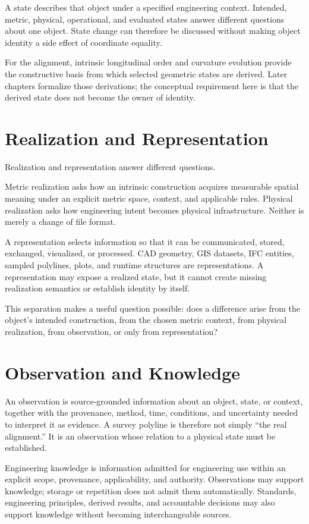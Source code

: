 A state describes that object under a specified engineering context. Intended,
metric, physical, operational, and evaluated states answer different questions
about one object. State change can therefore be discussed without making object
identity a side effect of coordinate equality.

For the alignment, intrinsic longitudinal order and curvature evolution provide
the constructive basis from which selected geometric states are derived. Later
chapters formalize those derivations; the conceptual requirement here is that
the derived state does not become the owner of identity.

\section{Realization and Representation}

Realization and representation answer different questions.

Metric realization asks how an intrinsic construction acquires measurable
spatial meaning under an explicit metric space, context, and applicable rules.
Physical realization asks how engineering intent becomes physical
infrastructure. Neither is merely a change of file format.

A representation selects information so that it can be communicated, stored,
exchanged, visualized, or processed. CAD geometry, GIS datasets, IFC entities,
sampled polylines, plots, and runtime structures are representations. A
representation may expose a realized state, but it cannot create missing
realization semantics or establish identity by itself.

This separation makes a useful question possible: does a difference arise from
the object's intended construction, from the chosen metric context, from
physical realization, from observation, or only from representation?

\section{Observation and Knowledge}

An observation is source-grounded information about an object, state, or
context, together with the provenance, method, time, conditions, and uncertainty
needed to interpret it as evidence. A survey polyline is therefore not simply
``the real alignment.'' It is an observation whose relation to a physical state
must be established.

Engineering knowledge is information admitted for engineering use within an
explicit scope, provenance, applicability, and authority. Observations may
support knowledge; storage or repetition does not admit them automatically.
Standards, engineering principles, derived results, and accountable decisions
may also support knowledge without becoming interchangeable sources.

